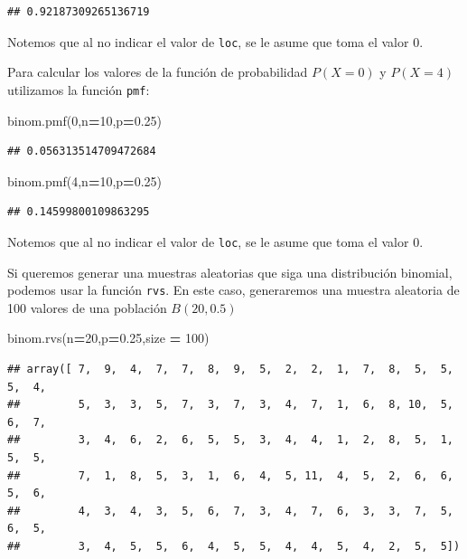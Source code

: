 \documentclass[]{book}
\newenvironment{Shaded}{\begin{snugshade}}{\end{snugshade}}
\newcommand{\DecValTok}[1]{\textcolor[rgb]{0.00,0.00,0.81}{#1}}
\newcommand{\FloatTok}[1]{\textcolor[rgb]{0.00,0.00,0.81}{#1}}
\newcommand{\NormalTok}[1]{#1}
\newcommand{\OperatorTok}[1]{\textcolor[rgb]{0.81,0.36,0.00}{\textbf{#1}}}
\begin{document}
\begin{verbatim}
## 0.92187309265136719
\end{verbatim}

Notemos que al no indicar el valor de \texttt{loc}, se le asume que toma el valor 0.

Para calcular los valores de la función de probabilidad \(P(X=0)\) y \(P(X=4)\) utilizamos la función \texttt{pmf}:

\begin{Shaded}
\begin{Highlighting}[]
\NormalTok{binom.pmf(}\DecValTok{0}\NormalTok{,n}\OperatorTok{=}\DecValTok{10}\NormalTok{,p}\OperatorTok{=}\FloatTok{0.25}\NormalTok{)}
\end{Highlighting}
\end{Shaded}

\begin{verbatim}
## 0.056313514709472684
\end{verbatim}

\begin{Shaded}
\begin{Highlighting}[]
\NormalTok{binom.pmf(}\DecValTok{4}\NormalTok{,n}\OperatorTok{=}\DecValTok{10}\NormalTok{,p}\OperatorTok{=}\FloatTok{0.25}\NormalTok{)}
\end{Highlighting}
\end{Shaded}

\begin{verbatim}
## 0.14599800109863295
\end{verbatim}

Notemos que al no indicar el valor de \texttt{loc}, se le asume que toma el valor 0.

Si queremos generar una muestras aleatorias que siga una distribución binomial, podemos usar la función \texttt{rvs}. En este caso, generaremos una muestra aleatoria de 100 valores de una población \(B(20,0.5)\)

\begin{Shaded}
\begin{Highlighting}[]
\NormalTok{binom.rvs(n}\OperatorTok{=}\DecValTok{20}\NormalTok{,p}\OperatorTok{=}\FloatTok{0.25}\NormalTok{,size }\OperatorTok{=} \DecValTok{100}\NormalTok{)}
\end{Highlighting}
\end{Shaded}

\begin{verbatim}
## array([ 7,  9,  4,  7,  7,  8,  9,  5,  2,  2,  1,  7,  8,  5,  5,  5,  4,
##         5,  3,  3,  5,  7,  3,  7,  3,  4,  7,  1,  6,  8, 10,  5,  6,  7,
##         3,  4,  6,  2,  6,  5,  5,  3,  4,  4,  1,  2,  8,  5,  1,  5,  5,
##         7,  1,  8,  5,  3,  1,  6,  4,  5, 11,  4,  5,  2,  6,  6,  5,  6,
##         4,  3,  4,  3,  5,  6,  7,  3,  4,  7,  6,  3,  3,  7,  5,  6,  5,
##         3,  4,  5,  5,  6,  4,  5,  5,  4,  4,  5,  4,  2,  5,  5])
\end{verbatim}
\end{document}
